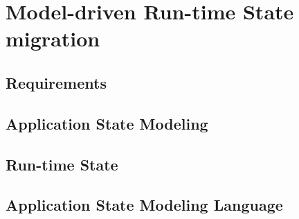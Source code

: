 \chapter{Model-driven Run-time State migration}
\label{ch:model_driven}

\section{Requirements}
\section{Application State Modeling}
\section{Run-time State}
\section{Application State Modeling Language}